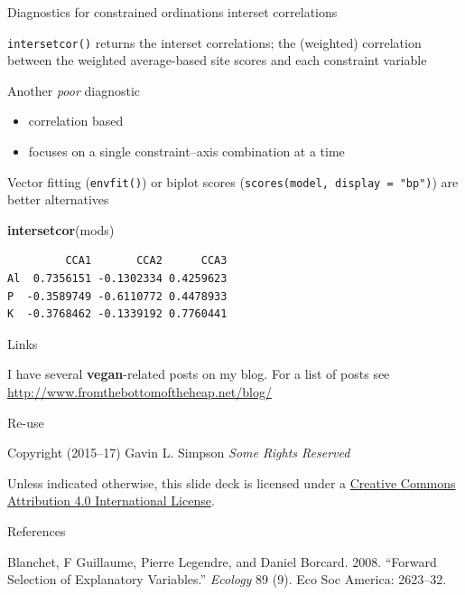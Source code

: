\documentclass[10pt,ignorenonframetext,compress, aspectratio=169]{beamer}
\newenvironment{Shaded}{\begin{snugshade}}{\end{snugshade}}
\newcommand{\KeywordTok}[1]{\textcolor[rgb]{0.13,0.29,0.53}{\textbf{{#1}}}}
\newcommand{\NormalTok}[1]{{#1}}
\providecommand{\tightlist}{%
  \setlength{\itemsep}{0pt}\setlength{\parskip}{0pt}}
\begin{document}
\begin{frame}[fragile]{Diagnostics for constrained ordinations
\textbar{} interset correlations}

\texttt{intersetcor()} returns the interset correlations; the (weighted)
correlation between the weighted average-based site scores and each
constraint variable

Another \emph{poor} diagnostic

\begin{itemize}
\tightlist
\item
  correlation based
\item
  focuses on a single constraint--axis combination at a time
\end{itemize}

Vector fitting (\texttt{envfit()}) or biplot scores
(\texttt{scores(model,\ display\ =\ "bp")}) are better alternatives

\scriptsize

\begin{Shaded}
\begin{Highlighting}[]
\KeywordTok{intersetcor}\NormalTok{(mods)}
\end{Highlighting}
\end{Shaded}

\begin{verbatim}
         CCA1       CCA2      CCA3
Al  0.7356151 -0.1302334 0.4259623
P  -0.3589749 -0.6110772 0.4478933
K  -0.3768462 -0.1339192 0.7760441
\end{verbatim}

\normalsize

\end{frame}

\begin{frame}{Links}

I have several \textbf{vegan}-related posts on my blog. For a list of
posts see \href{}{http://www.fromthebottomoftheheap.net/blog/}

\end{frame}

\begin{frame}{Re-use}

Copyright \textcopyright (2015--17) Gavin L. Simpson \emph{Some Rights
Reserved}

Unless indicated otherwise, this slide deck is licensed under a
\href{http://creativecommons.org/licenses/by/4.0/}{Creative Commons
Attribution 4.0 International License}.

\begin{center}
  \ccby
\end{center}

\end{frame}

\begin{frame}{References}

\hypertarget{refs}{}
\hypertarget{ref-Blanchet2008}{}
Blanchet, F Guillaume, Pierre Legendre, and Daniel Borcard. 2008.
``Forward Selection of Explanatory Variables.'' \emph{Ecology} 89 (9).
Eco Soc America: 2623--32.

\end{frame}
\end{document}
